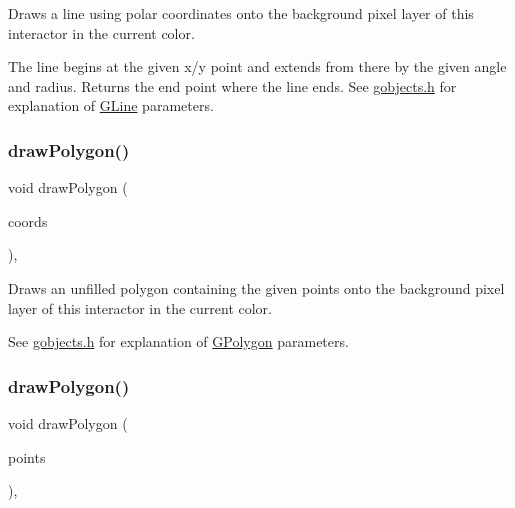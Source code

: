Draws a line using polar coordinates onto the background pixel layer of this interactor in the current color. 

The line begins at the given x/y point and extends from there by the given angle and radius. Returns the end point where the line ends. See \mbox{\hyperlink{gobjects_8h_source}{gobjects.\+h}} for explanation of \mbox{\hyperlink{classsgl_1_1GLine}{G\+Line}} parameters. \mbox{\label{classsgl_1_1GDrawingSurface_afddec0a905108d8a8d6809a157f26776}} 
\subsubsection{\texorpdfstring{draw\+Polygon()}{drawPolygon()}\hspace{0.1cm}{\footnotesize\ttfamily [1/2]}}
{\footnotesize\ttfamily void draw\+Polygon (\begin{DoxyParamCaption}\item[{std\+::initializer\+\_\+list$<$ double $>$}]{coords }\end{DoxyParamCaption})\hspace{0.3cm}{\ttfamily [virtual]}, {\ttfamily [inherited]}}



Draws an unfilled polygon containing the given points onto the background pixel layer of this interactor in the current color. 

See \mbox{\hyperlink{gobjects_8h_source}{gobjects.\+h}} for explanation of \mbox{\hyperlink{classsgl_1_1GPolygon}{G\+Polygon}} parameters. \mbox{\label{classsgl_1_1GDrawingSurface_a021ee881e0d154dc4dd059698742889c}} 
\subsubsection{\texorpdfstring{draw\+Polygon()}{drawPolygon()}\hspace{0.1cm}{\footnotesize\ttfamily [2/2]}}
{\footnotesize\ttfamily void draw\+Polygon (\begin{DoxyParamCaption}\item[{std\+::initializer\+\_\+list$<$ \mbox{\hyperlink{structsgl_1_1GPoint}{G\+Point}} $>$}]{points }\end{DoxyParamCaption})\hspace{0.3cm}{\ttfamily [virtual]}, {\ttfamily [inherited]}}




